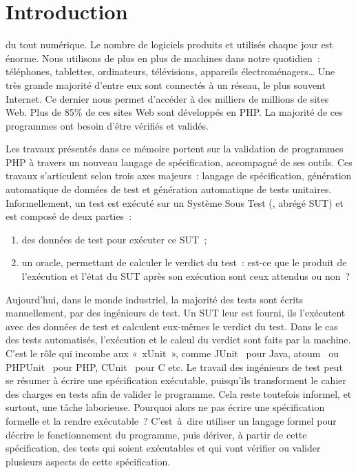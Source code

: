 \chapter{Introduction}
\label{chapter:introduction}

\mminitoc

 du tout numérique. Le nombre de logiciels produits et utilisés
chaque jour est énorme. Nous utilisons de plus en plus de machines dans notre
quotidien~: téléphones, tablettes, ordinateurs, télévisions, appareils
électroménagers… Une très grande majorité d'entre eux sont connectés à un
réseau, le plus souvent Internet. Ce dernier nous permet d'accéder à des
milliers de millions de sites Web. Plus de 85\% de ces sites Web sont développés
en PHP. La majorité de ces programmes ont besoin d'être vérifiés et validés.

Les travaux présentés dans ce mémoire portent sur la validation de programmes
PHP à travers un nouveau langage de spécification, accompagné de ses outils. Ces
travaux s'articulent selon trois axes majeurs~: langage de spécification,
génération automatique de données de test et génération automatique de tests
unitaires. \\

Informellement, un test est exécuté sur un Système Sous Test (, abrégé {\strong SUT}) et est composé de deux parties~:
%
\begin{enumerate}

\item des {\strong données de test} pour exécuter ce SUT~;

\item un {\strong oracle}, permettant de calculer le verdict du test~: est-ce
que le produit de l'exécution et l'état du SUT après son exécution sont ceux
attendus ou non~?

\end{enumerate}

Aujourd'hui, dans le monde industriel, la majorité des tests sont écrits
{\strong manuellement}, par des ingénieurs de test. Un SUT leur est fourni, ils
l'exécutent avec des données de test et calculent eux-mêmes le verdict du test.
Dans le cas des tests {\strong automatisés}, l'exécution et le calcul du verdict
sont faits par la machine. C'est le rôle qui incombe aux 
«~xUnit~», comme JUnit~ pour Java, atoum~ ou
PHPUnit~ pour PHP, CUnit~ pour C etc. Le travail des
ingénieurs de test peut se résumer à écrire une spécification exécutable,
puisqu'ils transforment le cahier des charges en tests afin de valider le
programme. Cela reste toutefois informel, et surtout, une tâche laborieuse.
Pourquoi alors ne pas écrire une spécification formelle et la rendre
exécutable~? C'est~à~dire utiliser un langage formel pour décrire le
fonctionnement du programme, puis dériver, à partir de cette spécification, des
tests qui soient exécutables et qui vont vérifier ou valider plusieurs aspects
de cette spécification.

